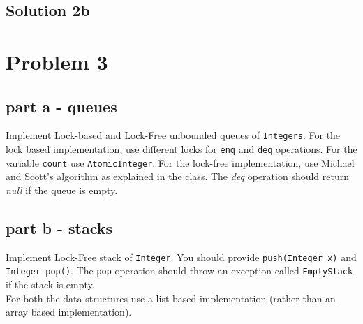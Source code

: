 \documentclass{article}
\begin{document}
\subsection{Solution 2b}


\pagebreak
\section{Problem 3}
\subsection{part a - queues}
Implement Lock-based and Lock-Free unbounded queues of {\tt Integers}.
For the lock based implementation, use different locks for {\tt enq} and {\tt deq} operations.
For the variable {\tt count} use {\tt AtomicInteger}. 
For the lock-free implementation, 
use Michael and Scott's algorithm as
explained in the class. The {\em deq} operation should return {\em null}
if the queue is empty.\\

\subsection{part b - stacks}
Implement Lock-Free stack of {\tt Integer}. You should provide {\tt push(Integer x)}
and {\tt Integer pop()}. The {\tt pop} operation should throw an exception called
{\tt EmptyStack} if the stack is empty.
\\
For both the data structures use a list based implementation (rather than an array based implementation).
\end{document}
